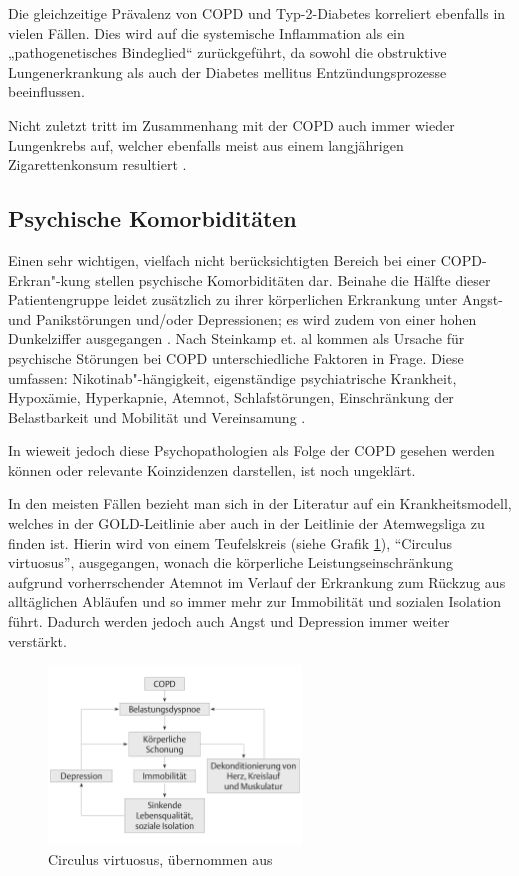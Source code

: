 Die gleichzeitige Prävalenz von COPD und Typ-2-Diabetes korreliert ebenfalls in vielen Fällen. Dies wird auf die systemische Inflammation als ein „pathogenetisches Bindeglied“ zurückgeführt, da sowohl die obstruktive Lungenerkrankung als auch der Diabetes mellitus Entzündungsprozesse beeinflussen.

Nicht zuletzt tritt im Zusammenhang mit der COPD auch immer wieder Lungenkrebs auf, welcher ebenfalls meist aus einem langjährigen Zigarettenkonsum resultiert \autocite[vgl.][38]{stiefelhagen2013}.


\subsection{Psychische Komorbiditäten}
\label{psychische_komorbiditaet}
Einen sehr wichtigen, vielfach nicht berücksichtigten Bereich bei einer COPD-Erkran"-kung stellen psychische Komorbiditäten dar.
Beinahe die Hälfte dieser Patientengruppe leidet zusätzlich zu ihrer körperlichen Erkrankung unter Angst- und Panikstörungen und/oder Depressionen; es wird zudem von einer hohen Dunkelziffer ausgegangen \autocite[vgl.][157]{fischer2007}.
Nach Steinkamp et. al kommen als Ursache für psychische Störungen bei COPD unterschiedliche Faktoren in Frage.
Diese umfassen: Nikotinab"-hängigkeit, eigenständige psychiatrische Krankheit, Hypoxämie, Hyperkapnie, Atemnot, Schlafstörungen, Einschränkung der Belastbarkeit und Mobilität und Vereinsamung \autocite[vgl.][157]{fischer2007}.
 
In wieweit jedoch diese Psychopathologien als Folge der COPD gesehen werden können oder relevante Koinzidenzen darstellen, ist noch ungeklärt. 

In den meisten Fällen bezieht man sich in der Literatur auf ein Krankheitsmodell, welches in der GOLD-Leitlinie aber auch in der Leitlinie der Atemwegsliga zu finden ist. Hierin wird von einem Teufelskreis (siehe Grafik  \ref{fig:copd_teufelskreis}), "`Circulus virtuosus"', ausgegangen, wonach die körperliche Leistungseinschränkung aufgrund vorherrschender Atemnot im Verlauf der Erkrankung zum Rückzug aus alltäglichen Abläufen und so immer mehr zur Immobilität und sozialen Isolation führt. 
Dadurch werden jedoch auch Angst und Depression immer weiter verstärkt. 

\begin{figure}
 \centering
  \includegraphics[width=0.6\textwidth]{teufelskreis}
  \caption{Circulus virtuosus, übernommen aus \cite[e19]{vogelmeier2007}}
  \label{fig:copd_teufelskreis}
\end{figure}

